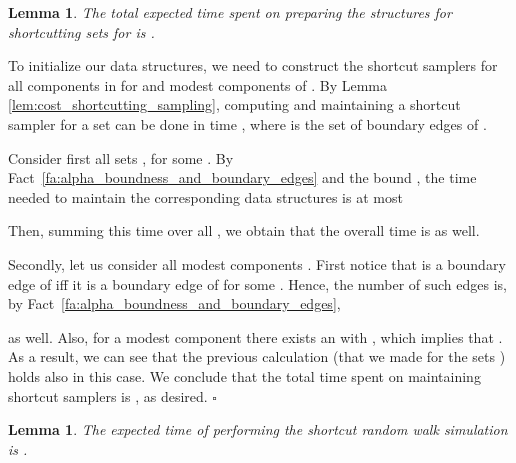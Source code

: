 \documentclass[11pt, letterpaper]{article}
\newtheorem{lemma}[theorem]{Lemma}
\newenvironment{proof}{\noindent{\bf Proof:}\hspace*{1em}}{\qed\bigskip}
\newcommand{\qed}{\hfill\ensuremath{\square}}
\begin{document}
\begin{lemma}\label{lem:preparation_cost}
The total expected time spent on preparing the structures for shortcutting sets  for  is .
\end{lemma}
\begin{proof}
To initialize our data structures, we need to construct the shortcut samplers for all components in  for  and modest components of . By Lemma \ref{lem:cost_shortcutting_sampling}, computing and maintaining a shortcut sampler for a set  can be done in time , where  is the set of boundary edges of .

Consider first all sets , for some . By Fact~\ref{fa:alpha_boundness_and_boundary_edges} and the bound , the time needed to maintain the corresponding data structures is at most

Then, summing this time over all , we obtain that the overall time is  as well.

Secondly, let us consider all modest components . First notice that  is a boundary edge of  iff it is a boundary edge of  for some . Hence, the number of such edges is, by Fact~\ref{fa:alpha_boundness_and_boundary_edges},

as well. Also, for a modest component  there exists an  with , which implies that . As a result, we can see that the previous calculation (that we made for the sets ) holds also in this case. We conclude that the total time spent on maintaining shortcut samplers is , as desired.
\end{proof}


\begin{lemma}\label{lem:walking_cost}
The expected time of performing the shortcut random walk simulation is .
\end{lemma}
\end{document}

